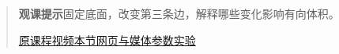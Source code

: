 \begin{quote}\small\textbf{观课提示}\quad 固定底面，改变第三条边，解释哪些变化影响有向体积。

\href{https://www.youtube.com/watch?v=BaM7OCEm3G0}{原课程视频}\quad\href{https://vitael04213.github.io/3blue1brown-notes/lessons/cross-products-extended.html}{本节网页与媒体}\quad\href{https://vitael04213.github.io/3blue1brown-notes/lab.html\#spatial}{参数实验}
\end{quote}
